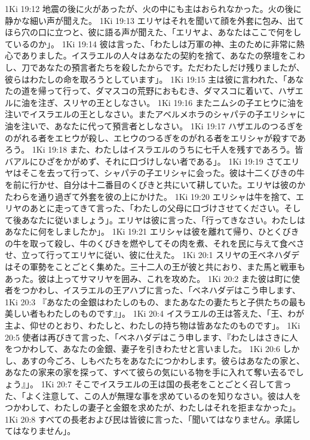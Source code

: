 1Ki 19:12  地震の後に火があったが、火の中にも主はおられなかった。火の後に静かな細い声が聞えた。
1Ki 19:13  エリヤはそれを聞いて顔を外套に包み、出てほら穴の口に立つと、彼に語る声が聞えた、「エリヤよ、あなたはここで何をしているのか」。
1Ki 19:14  彼は言った、「わたしは万軍の神、主のために非常に熱心でありました。イスラエルの人々はあなたの契約を捨て、あなたの祭壇をこわし、刀であなたの預言者たちを殺したからです。ただわたしだけ残りましたが、彼らはわたしの命を取ろうとしています」。
1Ki 19:15  主は彼に言われた、「あなたの道を帰って行って、ダマスコの荒野におもむき、ダマスコに着いて、ハザエルに油を注ぎ、スリヤの王としなさい。
1Ki 19:16  またニムシの子エヒウに油を注いでイスラエルの王としなさい。またアベルメホラのシャパテの子エリシャに油を注いで、あなたに代って預言者としなさい。
1Ki 19:17  ハザエルのつるぎをのがれる者をエヒウが殺し、エヒウのつるぎをのがれる者をエリシャが殺すであろう。
1Ki 19:18  また、わたしはイスラエルのうちに七千人を残すであろう。皆バアルにひざをかがめず、それに口づけしない者である」。
1Ki 19:19  さてエリヤはそこを去って行って、シャパテの子エリシャに会った。彼は十二くびきの牛を前に行かせ、自分は十二番目のくびきと共にいて耕していた。エリヤは彼のかたわらを通り過ぎて外套を彼の上にかけた。
1Ki 19:20  エリシャは牛を捨て、エリヤのあとに走ってきて言った、「わたしの父母に口づけさせてください。そして後あなたに従いましょう」。エリヤは彼に言った、「行ってきなさい。わたしはあなたに何をしましたか」。
1Ki 19:21  エリシャは彼を離れて帰り、ひとくびきの牛を取って殺し、牛のくびきを燃やしてその肉を煮、それを民に与えて食べさせ、立って行ってエリヤに従い、彼に仕えた。
1Ki 20:1  スリヤの王ベネハダデはその軍勢をことごとく集めた。三十二人の王が彼と共におり、また馬と戦車もあった。彼は上ってサマリヤを囲み、これを攻めた。
1Ki 20:2  また彼は町に使者をつかわし、イスラエルの王アハブに言った、「ベネハダデはこう申します、
1Ki 20:3  『あなたの金銀はわたしのもの、またあなたの妻たちと子供たちの最も美しい者もわたしのものです』」。
1Ki 20:4  イスラエルの王は答えた、「王、わが主よ、仰せのとおり、わたしと、わたしの持ち物は皆あなたのものです」。
1Ki 20:5  使者は再びきて言った、「ベネハダデはこう申します、『わたしはさきに人をつかわして、あなたの金銀、妻子を引きわたせと言いました。
1Ki 20:6  しかし、あすの今ごろ、しもべたちをあなたにつかわします。彼らはあなたの家と、あなたの家来の家を探って、すべて彼らの気にいる物を手に入れて奪い去るでしょう』」。
1Ki 20:7  そこでイスラエルの王は国の長老をことごとく召して言った、「よく注意して、この人が無理な事を求めているのを知りなさい。彼は人をつかわして、わたしの妻子と金銀を求めたが、わたしはそれを拒まなかった」。
1Ki 20:8  すべての長老および民は皆彼に言った、「聞いてはなりません。承諾してはなりません」。
